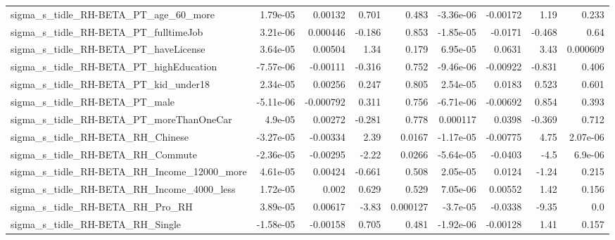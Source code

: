 \begin{tabular}{lrrrrrrrr}
sigma\_s\_tidle\_RH-BETA\_PT\_age\_60\_more               &    1.79e-05 &      0.00132 &     0.701 &    0.483 &  -3.36e-06 &    -0.00172 &         1.19 &         0.233 \\
sigma\_s\_tidle\_RH-BETA\_PT\_fulltimeJob               &    3.21e-06 &     0.000446 &    -0.186 &    0.853 &  -1.85e-05 &     -0.0171 &       -0.468 &          0.64 \\
sigma\_s\_tidle\_RH-BETA\_PT\_haveLicense               &    3.64e-05 &      0.00504 &      1.34 &    0.179 &   6.95e-05 &      0.0631 &         3.43 &      0.000609 \\
sigma\_s\_tidle\_RH-BETA\_PT\_highEducation             &   -7.57e-06 &     -0.00111 &    -0.316 &    0.752 &  -9.46e-06 &    -0.00922 &       -0.831 &         0.406 \\
sigma\_s\_tidle\_RH-BETA\_PT\_kid\_under18               &    2.34e-05 &      0.00256 &     0.247 &    0.805 &   2.54e-05 &      0.0183 &        0.523 &         0.601 \\
sigma\_s\_tidle\_RH-BETA\_PT\_male                      &   -5.11e-06 &    -0.000792 &     0.311 &    0.756 &  -6.71e-06 &    -0.00692 &        0.854 &         0.393 \\
sigma\_s\_tidle\_RH-BETA\_PT\_moreThanOneCar            &     4.9e-05 &      0.00272 &    -0.281 &    0.778 &   0.000117 &      0.0398 &       -0.369 &         0.712 \\
sigma\_s\_tidle\_RH-BETA\_RH\_Chinese                   &   -3.27e-05 &     -0.00334 &      2.39 &   0.0167 &  -1.17e-05 &    -0.00775 &         4.75 &      2.07e-06 \\
sigma\_s\_tidle\_RH-BETA\_RH\_Commute                   &   -2.36e-05 &     -0.00295 &     -2.22 &   0.0266 &  -5.64e-05 &     -0.0403 &         -4.5 &       6.9e-06 \\
sigma\_s\_tidle\_RH-BETA\_RH\_Income\_12000\_more         &    4.61e-05 &      0.00424 &    -0.661 &    0.508 &   2.05e-05 &      0.0124 &        -1.24 &         0.215 \\
sigma\_s\_tidle\_RH-BETA\_RH\_Income\_4000\_less          &    1.72e-05 &        0.002 &     0.629 &    0.529 &   7.05e-06 &     0.00552 &         1.42 &         0.156 \\
sigma\_s\_tidle\_RH-BETA\_RH\_Pro\_RH                    &    3.89e-05 &      0.00617 &     -3.83 & 0.000127 &   -3.7e-05 &     -0.0338 &        -9.35 &           0.0 \\
sigma\_s\_tidle\_RH-BETA\_RH\_Single                    &   -1.58e-05 &     -0.00158 &     0.705 &    0.481 &  -1.92e-06 &    -0.00128 &         1.41 &         0.157 \\

\end{tabular}
